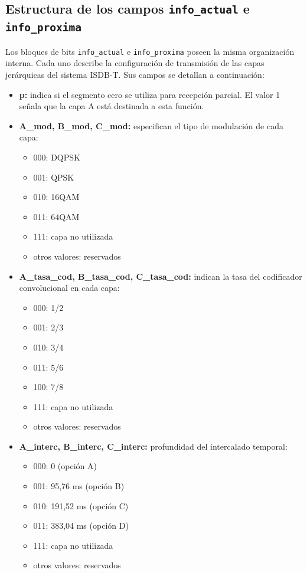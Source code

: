 \subsection{Estructura de los campos \texttt{info\_actual} e \texttt{info\_proxima}}

Los bloques de bits \texttt{info\_actual} e \texttt{info\_proxima} poseen la misma organización interna. Cada uno describe la configuración de transmisión de las capas jerárquicas del sistema ISDB-T. Sus campos se detallan a continuación:

\begin{itemize}
\item \textbf{p:} indica si el segmento cero se utiliza para recepción parcial. El valor 1 señala que la capa A está destinada a esta función.
\item \textbf{A\_mod, B\_mod, C\_mod:} especifican el tipo de modulación de cada capa:
\begin{itemize}
\item 000: DQPSK
\item 001: QPSK
\item 010: 16QAM
\item 011: 64QAM
\item 111: capa no utilizada
\item otros valores: reservados
\end{itemize}

\item \textbf{A\_tasa\_cod, B\_tasa\_cod, C\_tasa\_cod:} indican la tasa del codificador convolucional en cada capa:
\begin{itemize}
\item 000: 1/2
\item 001: 2/3
\item 010: 3/4
\item 011: 5/6
\item 100: 7/8
\item 111: capa no utilizada
\item otros valores: reservados
\end{itemize}

\item \textbf{A\_interc, B\_interc, C\_interc:} profundidad del intercalado temporal:
\begin{itemize}
\item 000: 0 (opción A)
\item 001: 95,76 ms (opción B)
\item 010: 191,52 ms (opción C)
\item 011: 383,04 ms (opción D)
\item 111: capa no utilizada
\item otros valores: reservados
\end{itemize}


\end{itemize}

